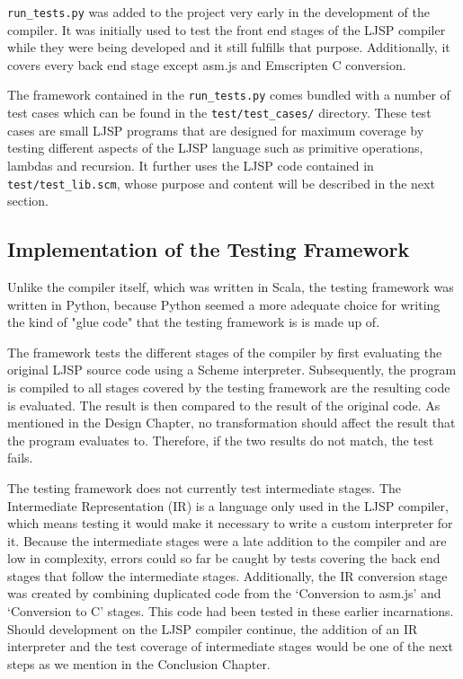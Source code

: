 \documentclass[11pt]{report}
\begin{document}
\texttt{run_tests.py} was added to the project very early in the development of the compiler. It was initially used to test the front end stages of the LJSP compiler while they were being developed and it still fulfills that purpose. Additionally, it covers every back end stage except asm.js and Emscripten C conversion.

The framework contained in the \texttt{run_tests.py} comes bundled with a number of test cases which can be found in the \texttt{test/test_cases/} directory. These test cases are small LJSP programs that are designed for maximum coverage by testing different aspects of the LJSP language such as primitive operations, lambdas and recursion. It further uses the LJSP code contained in \texttt{test/test_lib.scm}, whose purpose and content will be described in the next section.

\subsection{Implementation of the Testing Framework}
Unlike the compiler itself, which was written in Scala, the testing framework was written in Python, because Python seemed a more adequate choice for writing the kind of "glue code" that the testing framework is is made up of. 

The framework tests the different stages of the compiler by first evaluating the original LJSP source code using a Scheme interpreter. Subsequently, the program is compiled to all stages covered by the testing framework are the resulting code is evaluated. The result is then compared to the result of the original code. As mentioned in the Design Chapter, no transformation should affect the result that the program evaluates to. Therefore, if the two results do not match, the test fails.

The testing framework does not currently test intermediate stages. The Intermediate Representation (IR) is a language only used in the LJSP compiler, which means testing it would make it necessary to write a custom interpreter for it. Because the intermediate stages were a late addition to the compiler and are low in complexity, errors could so far be caught by tests covering the back end stages that follow the intermediate stages. Additionally, the IR conversion stage was created by combining duplicated code from the `Conversion to asm.js' and `Conversion to C' stages. This code had been tested in these earlier incarnations. Should development on the LJSP compiler continue, the addition of an IR interpreter and the test coverage of intermediate stages would be one of the next steps as we mention in the Conclusion Chapter.
\end{document}
